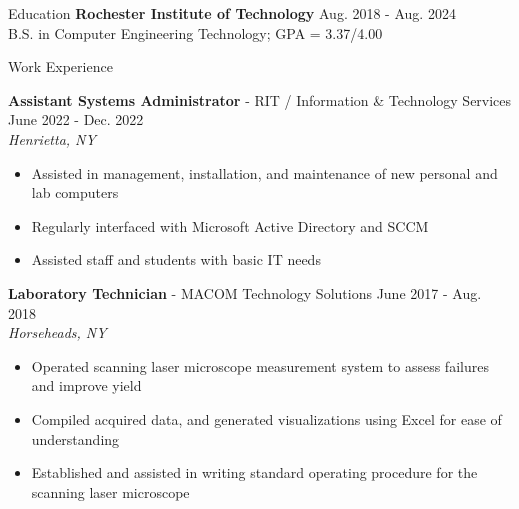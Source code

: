 \documentclass[UTF-8]{resume} \usepackage{multirow}
\begin{document}
\begin{rSection}{Education}
	{\bf Rochester Institute of Technology}  \hfill {Aug. 2018 - Aug. 2024}\\
	B.S. in Computer Engineering Technology; GPA = 3.37/4.00
\end{rSection}


\begin{rSection}{Work Experience}
	\vspace{-1.6em}
	\item \textbf{Assistant Systems Administrator} {- RIT / Information \& Technology Services } \hfill {June 2022 - Dec. 2022}\\
	\emph{Henrietta, NY}
	\begin{itemize}
		\itemsep -5pt {}
		\item Assisted in management, installation, and maintenance of new personal and lab computers
		\item Regularly interfaced with Microsoft Active Directory and SCCM
		\item Assisted staff and students with basic IT needs
	\end{itemize}
	\item \textbf{Laboratory Technician} {- MACOM Technology Solutions} \hfill {June 2017 - Aug. 2018}\\
	\emph{Horseheads, NY}
	\begin{itemize}
		\itemsep -5pt {}
		\item Operated scanning laser microscope measurement system to assess failures and improve yield
		\item Compiled acquired data, and generated visualizations using Excel for ease of understanding
		\item Established and assisted in writing standard operating procedure for the scanning laser microscope
	\end{itemize}
\end{rSection}
\end{document}
